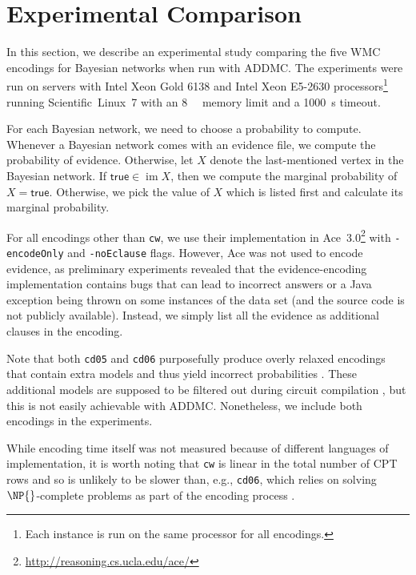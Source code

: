 \documentclass{article}
\DeclareMathOperator{\im}{im}
\begin{document}
\section{Experimental Comparison} \label{sec:experiments}

In this section, we describe an experimental study comparing the five WMC
encodings for Bayesian networks when run with ADDMC. The experiments were run on
servers with Intel Xeon Gold 6138 and Intel Xeon E5-2630
processors\footnote{Each instance is run on the same processor for all
  encodings.} running Scientific~Linux~7 with an \SI{8}{\gibi\byte} memory limit
and a \SI{1000}{\second} timeout.

For each Bayesian network, we need to choose a probability to compute. Whenever
a Bayesian network comes with an evidence file, we compute the probability of
evidence. Otherwise, let $X$ denote the last-mentioned vertex in the Bayesian
network. If $\mathsf{true} \in \im X$, then we compute the marginal probability
of $X = \mathsf{true}$. Otherwise, we pick the value of $X$ which is listed
first and calculate its marginal probability.

For all encodings other than \texttt{cw}, we use their implementation in
Ace~3.0\footnote{\url{http://reasoning.cs.ucla.edu/ace/}} with
\texttt{-encodeOnly} and \texttt{-noEclause} flags. However, Ace was not used to
encode evidence, as preliminary experiments revealed that the evidence-encoding
implementation contains bugs that can lead to incorrect answers or a Java
exception being thrown on some instances of the data set (and the source code is
not publicly available). Instead, we simply list all the evidence as additional
clauses in the encoding.

Note that both \texttt{cd05} and \texttt{cd06} purposefully produce overly
relaxed encodings that contain extra models and thus yield incorrect
probabilities \cite{DBLP:conf/ijcai/ChaviraD05,DBLP:conf/sat/ChaviraD06}. These
additional models are supposed to be filtered out during circuit compilation
\cite{DBLP:conf/ijcai/ChaviraD05}, but this is not easily achievable with ADDMC.
Nonetheless, we include both encodings in the experiments.

While encoding time itself was not measured because of different languages of
implementation, it is worth noting that \texttt{cw} is linear in the total
number of CPT rows and so is unlikely to be slower than, e.g., \texttt{cd06},
which relies on solving $\NP{}$-complete problems as part of the encoding process
\cite{DBLP:conf/sat/ChaviraD06}.
\end{document}
